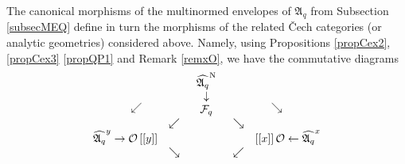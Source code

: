 \documentclass[12pt]{amsart}%
\theoremstyle{plain}
\numberwithin{equation}{section}
\numberwithin{equation}{section}
\numberwithin{theorem}{section}
\numberwithin{lemma}{section}
\numberwithin{remark}{section}
\numberwithin{example}{section}
\numberwithin{proposition}{section}
\numberwithin{definition}{section}
\numberwithin{corollary}{section}
\begin{document}
The canonical morphisms of the multinormed envelopes of $\mathfrak{A}_{q}$
from Subsection \ref{subsecMEQ} define in turn the morphisms of the related
\v{C}ech\textit{ }categories (or analytic geometries) considered above.
Namely, using Propositions \ref{propCex2}, \ref{propCex3} \ref{propQP1} and
Remark \ref{remxO}, we have the commutative diagrams
\[%
\begin{array}
[c]{ccccc}%
\begin{array}
[c]{c}%
\\
\\
\end{array}%
\begin{array}
[c]{c}%
\\
\\
\end{array}%
\begin{array}
[c]{c}%
\\
\\
\swarrow
\end{array}
&  &
\begin{array}
[c]{c}%
\widehat{\mathfrak{A}_{q}}^{\text{N}}\\
\downarrow\\
\mathcal{F}_{q}%
\end{array}
&  &
\begin{array}
[c]{c}%
\\
\\
\searrow
\end{array}%
\begin{array}
[c]{c}%
\\
\\
\end{array}%
\begin{array}
[c]{c}%
\\
\\
\end{array}
\\
& \swarrow &  & \searrow & \\
\widehat{\mathfrak{A}_{q}}^{y}\rightarrow\mathcal{O}\left[  \left[  y\right]
\right]  &  &  &  & \left[  \left[  x\right]  \right]  \mathcal{O}%
\leftarrow\widehat{\mathfrak{A}_{q}}^{x}\\
& \searrow &  & \swarrow & \\%
\begin{array}
[c]{c}%
\\
\\
\end{array}%
\begin{array}
[c]{c}%
\\

\end{array}
\end{array}\]
\end{document}
